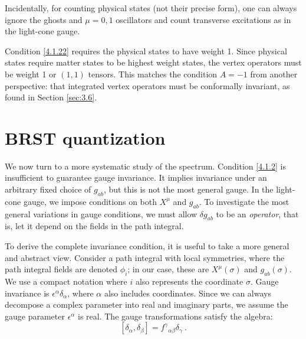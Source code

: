 Incidentally, for counting physical states (not their precise form), one can always ignore the ghosts and $\mu=0,1$ oscillators and count transverse excitations as in the light-cone gauge.

Condition \eqref{4.1.22} requires the physical states to have weight 1. Since physical states require matter states to be highest weight states, the vertex operators must be weight 1 or $(1,1)$ tensors. This matches the condition $A=-1$ from another perspective: that integrated vertex operators must be conformally invariant, as found in Section \ref{sec:3.6}.

\section{\texorpdfstring{BRST quantization}{BRST quantization}} \label{sec:4.2}

We now turn to a more systematic study of the spectrum. Condition \eqref{4.1.2} is insufficient to guarantee gauge invariance. It implies invariance under an arbitrary fixed choice of $g_{ab}$, but this is not the most general gauge. In the light-cone gauge, we impose conditions on both $X^\mu$ and $g_{ab}$. To investigate the most general variations in gauge conditions, we must allow $\delta g_{ab}$ to be an \emph{operator}, that is, let it depend on the fields in the path integral.

To derive the complete invariance condition, it is useful to take a more general and abstract view. Consider a path integral with local symmetries, where the path integral fields are denoted $\phi_{i}$; in our case, these are $X^{\mu}(\sigma)$ and $g_{a b}(\sigma)$. We use a compact notation where $i$ also represents the coordinate $\sigma$. Gauge invariance is $\epsilon^{\alpha} \delta_{\alpha}$, where $\alpha$ also includes coordinates. Since we can always decompose a complex parameter into real and imaginary parts, we assume the gauge parameter $\epsilon^{\alpha}$ is real. The gauge transformations satisfy the algebra:
\begin{equation}\label{4.2.1}
	[\delta_{\alpha}, \delta_{\beta}]=f^{\gamma}{}_{\alpha \beta} \delta_{\gamma} \:. 
\end{equation}

